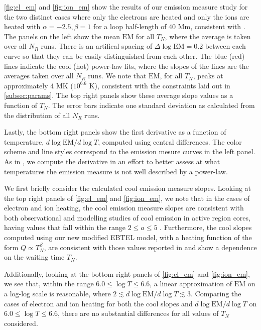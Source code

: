 \documentclass[apj]{emulateapj}
\begin{document}
	\par \autoref{fig:el_em} and \autoref{fig:ion_em} show the results of our emission measure study for the two distinct cases where only the electrons are heated and only the ions are heated with $\alpha=-2.5,\beta=1$ for a loop half-length of $40$ Mm, consistent with . The panels on the left show the mean $\mathrm{EM}$ for all $T_N$, where the average is taken over all $N_{R}$ runs. There is an artifical spacing of $\Delta\log{\mathrm{EM}}=0.2$ between each curve so that they can be easily distinguished from each other. The blue (red) lines indicate the cool (hot) power-law fits, where the slopes of the lines are the averages taken over all $N_{R}$ runs. We note that $\mathrm{EM}$, for all $T_N$, peaks at approximately 4 MK ($10^{6.6}$ K), consistent with the constraints laid out in \autoref{subsec:params}. The top right panels show these average slope values as a function of $T_N$. The error bars indicate one standard deviation as calculated from the distribution of all $N_{R}$ runs.
	\par Lastly, the bottom right panels show the first derivative as a function of temperature, $d\log{\mathrm{EM}}/d\log{T}$, computed using central differences. The color scheme and line styles correspond to the emission mesure curves in the left panel. As in , we compute the derivative in an effort to better assess at what temperatures the emission measure is not well described by a power-law.
	\par We first briefly consider the calculated cool emission measure slopes. Looking at the top right panels of \autoref{fig:el_em} and \autoref{fig:ion_em}, we note that in the cases of electron and ion heating, the cool emission measure slopes are consistent with both observational and modelling studies of cool emission in active region cores, having values that fall within the range $2\le a\le5$ \citep[and references therein]{bradshaw_diagnosing_2012}. Furthermore, the cool slopes computed using our new modified EBTEL model, with a heating function of the form $Q\propto T_N^{\beta}$, are consistent with those values reported in \citet{cargill_active_2014} and show a dependence on the waiting time $T_N$.  
	\par Additionally, looking at the bottom right panels of \autoref{fig:el_em} and \autoref{fig:ion_em}, we see that, within the range $6.0\le\log{T}\le6.6$, a linear approximation of $\mathrm{EM}$ on a log-log scale is reasonable, where $2\lesssim d\log{\mathrm{EM}/d\log{T}}\lesssim3$. Comparing the cases of electron and ion heating for both the cool slopes and $d\log{\mathrm{EM}/d\log{T}}$ on $6.0\le\log{T}\le6.6$, there are no substantial differences for all values of $T_N$ considered.
\end{document}
